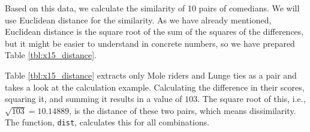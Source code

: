 \documentclass{ltjsbook}
\begin{document}
Based on this data, we calculate the similarity of 10 pairs of comedians. We will use Euclidean distance for the similarity. As we have already mentioned, Euclidean distance is the square root of the sum of the squares of the differences, but it might be easier to understand in concrete numbers, so we have prepared Table \ref{tbl:x15_distance}.

Table \ref{tbl:x15_distance} extracts only Mole riders and Lunge ties as a pair and takes a look at the calculation example. Calculating the difference in their scores, squaring it, and summing it results in a value of $103$. The square root of this, i.e., $\sqrt{103}=10.14889$, is the distance of these two pairs, which means dissimilarity. The function, \verb|dist|, calculates this for all combinations.



\end{document}
